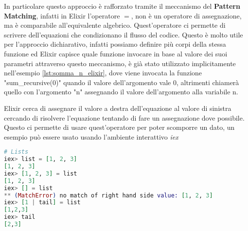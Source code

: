 In particolare questo approccio è rafforzato tramite il meccanismo
del \textbf{Pattern Matching}, infatti in Elixir l'operatore $=$,
non è un operatore di assegnazione, ma è comparabile
all'equivalente algebrico.
Quest'operatore ci permette di scrivere dell'equazioni
che condizionano il flusso del codice.
Questo è molto utile per l'approccio
dichiarativo, infatti possiamo definire più corpi della stessa funzione
ed Elixir capisce quale funzione invocare in base
al valore dei suoi parametri attraverso questo meccanismo,
è già stato utilizzato implicitamente nell'esempio \ref{lst:somma_n_elixir},
dove viene invocata la funzione "sum\_recursive(0)" quando
il valore dell'argomento vale 0, altrimenti chiamerà quello
con l'argomento "n" assegnando il valore dell'argomento alla variabile n.

Elixir cerca di assegnare il valore a destra dell'equazione
al valore di sinistra cercando di risolvere l'equazione tentando
di fare un assegnazione dove possibile.
Questo ci permette di usare quest'operatore per poter
scomporre un dato, un esempio può essere usato usando l'ambiente
interattivo \textit{iex}

\begin{lstlisting}[language=elixir, caption={Pattern Matching},captionpos=b,
	label={lst:pattern_matching}]
# Lists
iex> list = [1, 2, 3]
[1, 2, 3]
iex> [1, 2, 3] = list
[1, 2, 3]
iex> [] = list
** (MatchError) no match of right hand side value: [1, 2, 3]
iex> [1 | tail] = list
[1,2,3]
iex> tail
[2,3]
\end{lstlisting}








